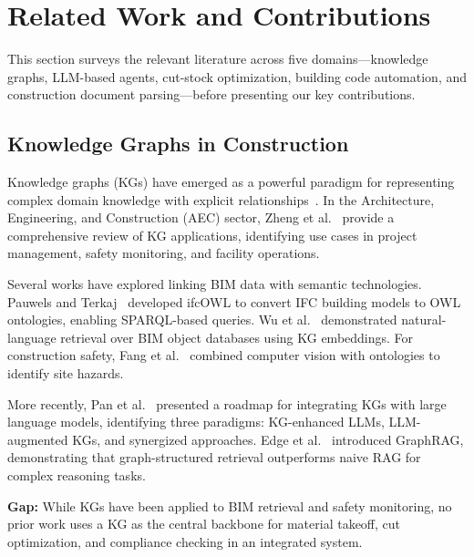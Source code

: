 
\section{Related Work and Contributions}

This section surveys the relevant literature across five domains---knowledge graphs, LLM-based agents, cut-stock optimization, building code automation, and construction document parsing---before presenting our key contributions.

\subsection{Knowledge Graphs in Construction}

Knowledge graphs (KGs) have emerged as a powerful paradigm for representing complex domain knowledge with explicit relationships~\cite{hogan2021kg_survey}.
In the Architecture, Engineering, and Construction (AEC) sector, Zheng et al.~\cite{zheng2022kg_construction} provide a comprehensive review of KG applications, identifying use cases in project management, safety monitoring, and facility operations.

Several works have explored linking BIM data with semantic technologies.
Pauwels and Terkaj~\cite{pauwels2017kg_ifc} developed ifcOWL to convert IFC building models to OWL ontologies, enabling SPARQL-based queries.
Wu et al.~\cite{wu2022kg_bim} demonstrated natural-language retrieval over BIM object databases using KG embeddings.
For construction safety, Fang et al.~\cite{fang2020kg_safety} combined computer vision with ontologies to identify site hazards.

More recently, Pan et al.~\cite{pan2024unifying_kg_llm} presented a roadmap for integrating KGs with large language models, identifying three paradigms: KG-enhanced LLMs, LLM-augmented KGs, and synergized approaches.
Edge et al.~\cite{edge2024graphrag} introduced GraphRAG, demonstrating that graph-structured retrieval outperforms naive RAG for complex reasoning tasks.

\textbf{Gap:} While KGs have been applied to BIM retrieval and safety monitoring, no prior work uses a KG as the central backbone for material takeoff, cut optimization, and compliance checking in an integrated system.

